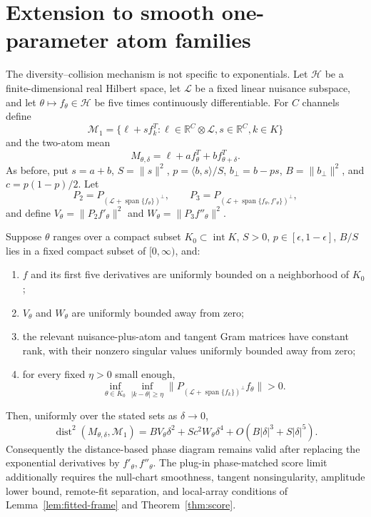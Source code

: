 \section{Extension to smooth one-parameter atom families}
\label{app:general-atom}

The diversity--collision mechanism is not specific to exponentials.  Let
$\mathcal H$ be a finite-dimensional real Hilbert space, let $\mathcal L$ be
a fixed linear nuisance subspace, and let $\theta\mapsto f_\theta\in\mathcal H$
be five times continuously differentiable.  For $C$ channels define
\[
\mathcal M_1=\{\ell+s f_k^T:\ell\in\mathbb R^C\otimes\mathcal L,
s\in\mathbb R^C,k\in K\}
\]
and the two-atom mean
\[
M_{\theta,\delta}=\ell+a f_\theta^T+b f_{\theta+\delta}^T.
\]
As before, put $s=a+b$, $S=\|s\|^2$,
$p=\langle b,s\rangle/S$, $b_\perp=b-ps$, $B=\|b_\perp\|^2$, and
$c=p(1-p)/2$.  Let
\[
P_2=P_{(\mathcal L+\operatorname{span}\{f_\theta\})^\perp},\qquad
P_3=P_{(\mathcal L+\operatorname{span}\{f_\theta,f'_\theta\})^\perp},
\]
and define $V_\theta=\|P_2f'_\theta\|^2$ and
$W_\theta=\|P_3f''_\theta\|^2$.

\begin{theorem}
\label{thm:general-atom}
Suppose $\theta$ ranges over a compact subset $K_0\subset\operatorname{int}K$,
$S>0$, $p\in[\epsilon,1-\epsilon]$, $B/S$ lies in a fixed compact subset of
$[0,\infty)$, and:
\begin{enumerate}
\item $f$ and its first five derivatives are uniformly bounded on a
neighborhood of $K_0$;
\item $V_\theta$ and $W_\theta$ are uniformly bounded away from zero;
\item the relevant nuisance-plus-atom and tangent Gram matrices have constant
rank, with their nonzero singular values uniformly bounded away from zero;
\item for every fixed $\eta>0$ small enough,
\[
\inf_{\theta\in K_0}\inf_{|k-\theta|\ge\eta}
\|P_{(\mathcal L+\operatorname{span}\{f_k\})^\perp}f_\theta\|>0.
\]
\end{enumerate}
Then, uniformly over the stated sets as $\delta\to0$,
\[
\operatorname{dist}^2(M_{\theta,\delta},\mathcal M_1)
=BV_\theta\delta^2+Sc^2W_\theta\delta^4
+O(B|\delta|^3+S|\delta|^5).
\]
Consequently the distance-based phase diagram remains valid after replacing
the exponential derivatives by $f'_\theta,f''_\theta$. The plug-in
phase-matched score limit additionally requires the null-chart smoothness,
tangent nonsingularity, amplitude lower bound, remote-fit separation, and
local-array conditions of Lemma~\ref{lem:fitted-frame} and
Theorem~\ref{thm:score}.
\end{theorem}

